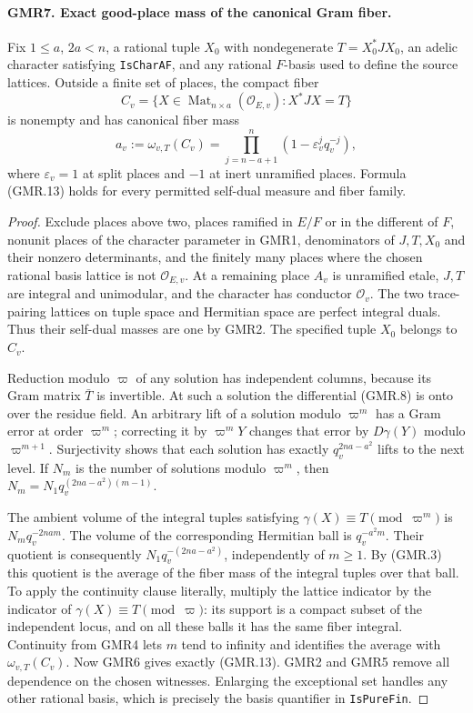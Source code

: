 \paragraph{GMR7. Exact good-place mass of the canonical Gram fiber.}
\label{claim:GMR7}
Fix $1\leq a$, $2a<n$, a rational tuple $X_0$ with nondegenerate
$T=X_0^*JX_0$, an adelic character satisfying \texttt{IsCharAF}, and
any rational $F$-basis used to define the source lattices.
Outside a finite set of places, the compact fiber
\[
 C_v=\{X\in\operatorname{Mat}_{n\times a}(\mathcal O_{E,v}):X^*JX=T\}
\]
is nonempty and has canonical fiber mass
\[
 a_v:=\omega_{v,T}(C_v)
       =\prod_{j=n-a+1}^{n}(1-\varepsilon_v^j q_v^{-j}),
 \tag{GMR.13}
\]
where $\varepsilon_v=1$ at split places and $-1$ at inert unramified
places.  Formula (GMR.13) holds for every permitted self-dual measure
and fiber family.

\begin{proof}
Exclude places above two, places ramified in $E/F$ or in the different
of $F$, nonunit places of the character parameter in GMR1, denominators
of $J,T,X_0$ and their nonzero determinants, and the finitely many
places where the chosen rational basis lattice is not
$\mathcal O_{E,v}$.  At a remaining place $A_v$ is unramified etale,
$J,T$ are integral and unimodular, and the character has conductor
$\mathcal O_v$.  The two trace-pairing lattices on tuple space and
Hermitian space are perfect integral duals.  Thus their self-dual
masses are one by GMR2.  The specified tuple $X_0$ belongs to $C_v$.

Reduction modulo $\varpi$ of any solution has independent columns,
because its Gram matrix $\bar T$ is invertible.  At such a solution
the differential (GMR.8) is onto over the residue field.  An arbitrary
lift of a solution modulo $\varpi^m$ has a Gram error at order
$\varpi^m$; correcting it by $\varpi^mY$ changes that error by
$D\gamma(Y)$ modulo $\varpi^{m+1}$.  Surjectivity shows that each
solution has exactly $q_v^{2na-a^2}$ lifts to the next level.
If $N_m$ is the number of solutions modulo $\varpi^m$, then
$N_m=N_1q_v^{(2na-a^2)(m-1)}$.

The ambient volume of the integral tuples satisfying
$\gamma(X)\equiv T\pmod{\varpi^m}$ is $N_mq_v^{-2nam}$.
The volume of the corresponding Hermitian ball is $q_v^{-a^2m}$.
Their quotient is consequently $N_1q_v^{-(2na-a^2)}$, independently
of $m\geq1$.  By (GMR.3) this quotient is the average of the fiber
mass of the integral tuples over that ball.  To apply the continuity
clause literally, multiply the lattice indicator by the indicator
of $\gamma(X)\equiv T\pmod\varpi$: its support is a compact subset
of the independent locus, and on all these balls it has the same
fiber integral.  Continuity from GMR4 lets $m$ tend to infinity and
identifies the average with $\omega_{v,T}(C_v)$.
Now GMR6 gives exactly (GMR.13).  GMR2 and GMR5 remove all dependence
on the chosen witnesses.  Enlarging the exceptional set handles any
other rational basis, which is precisely the basis quantifier in
\texttt{IsPureFin}.
\end{proof}

